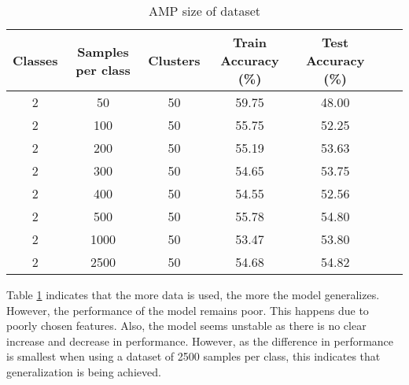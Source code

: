 \begin{table}[h!]
\begin{center}
\begin{tabular}{| c | c | c | c | c | c | c |}
\hline
 {\textbf{Classes}} 	 
 & {\textbf{Samples per class}} 					& {\textbf{Clusters}} 
 & {\textbf{Train Accuracy (\%)}} 					& {\textbf{Test Accuracy (\%)}} 
 \\
\hline
2 	 		& 50			& 50			& 	59.75	& 48.00		\\
2 	 		& 100 		& 50			& 	55.75	& 52.25		\\
2 	 		& 200 		& 50			& 	55.19	& 53.63		\\
2 	 		& 300 		& 50			& 	54.65	& 53.75		\\
2 	 		& 400 		& 50			& 	54.55	& 52.56		\\
2 	 		& 500 		& 50			& 	55.78	& 54.80		\\
2 	 		& 1000 		& 50			& 	53.47	& 53.80		\\
2 	 		& 2500 		& 50			& 	54.68	& 54.82		\\
\hline
\end{tabular}
\caption{AMP size of dataset}
\label{table:AMPdataset}
\end{center}
\end{table}

Table \ref{table:AMPdataset} indicates that the more data is used, the more the model generalizes. However, the performance of the model remains poor. This happens due to poorly chosen features. Also, the model seems unstable as there is no clear increase and decrease in performance. However, as the difference in performance is smallest when using a dataset of 2500 samples per class, this indicates that generalization is being achieved.